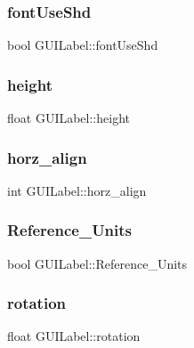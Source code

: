 \subsubsection{\texorpdfstring{font\+Use\+Shd}{fontUseShd}}
{\footnotesize\ttfamily bool G\+U\+I\+Label\+::font\+Use\+Shd}

\hypertarget{class_g_u_i_label_a3ff492313bb22a59dda753a1f72137df}{}\label{class_g_u_i_label_a3ff492313bb22a59dda753a1f72137df} 
\subsubsection{\texorpdfstring{height}{height}}
{\footnotesize\ttfamily float G\+U\+I\+Label\+::height}

\hypertarget{class_g_u_i_label_ac86e8c65197a2d5fe2a099fa12671117}{}\label{class_g_u_i_label_ac86e8c65197a2d5fe2a099fa12671117} 
\subsubsection{\texorpdfstring{horz\+\_\+align}{horz\_align}}
{\footnotesize\ttfamily int G\+U\+I\+Label\+::horz\+\_\+align}

\hypertarget{class_g_u_i_label_a2b5e0ab5a7756f1779936e04bcff1433}{}\label{class_g_u_i_label_a2b5e0ab5a7756f1779936e04bcff1433} 
\subsubsection{\texorpdfstring{Reference\+\_\+\+Units}{Reference\_Units}}
{\footnotesize\ttfamily bool G\+U\+I\+Label\+::\+Reference\+\_\+\+Units}

\hypertarget{class_g_u_i_label_ac0b64bd95180de756b80ae3c3d2951bc}{}\label{class_g_u_i_label_ac0b64bd95180de756b80ae3c3d2951bc} 
\subsubsection{\texorpdfstring{rotation}{rotation}}
{\footnotesize\ttfamily float G\+U\+I\+Label\+::rotation}

